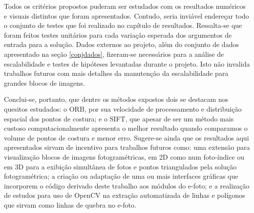 Todos os critérios propostos puderam ser estudados com os resultados numéricos e visuais distintos que foram apresentados. Contudo, seria inviável endereçar todo o conjunto de testes que foi realizado no capítulo de resultados. Ressalta-se que foram feitos testes unitários para cada variação esperada dos argumentos de entrada para a solução. Dados externos ao projeto, além do conjunto de dados apresentado na seção \ref{conjdados}, fizeram-se necessários para a análise de escalabilidade e testes de hipóteses levantadas durante o projeto. Isto não invalida trabalhos futuros com mais detalhes da manutenção da escalabilidade para grandes blocos de imagens. 

Conclui-se, portanto, que dentre os métodos expostos dois se destacam nos quesitos estudados: o ORB, por sua velocidade de processamento e distribuição espacial dos pontos de costura; e o SIFT, que apesar de ser um método mais custoso computacionalmente apresenta o melhor resultado quando comparamos o volume de pontos de costura e menor erro. Sugere-se ainda que os resultados aqui apresentados sirvam de incentivo para trabalhos futuros como: uma extensão para visualização blocos de imagens fotogramétricas, em 2D como num foto-índice ou em 3D para a exibição simultânea de fotos e pontos triangulados pela solução fotogramétrica; a criação ou adaptação de uma ou mais interfaces gráficas que incorporem o código derivado deste trabalho aos módulos do e-foto; e a realização de estudos para uso de OpenCV na extração automatizada de linhas e polígonos que sirvam como linhas de quebra no e-foto.